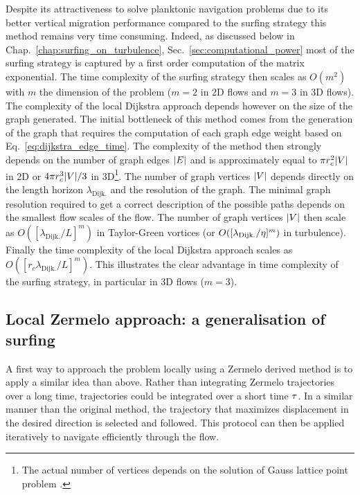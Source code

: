 Despite its attractiveness to solve planktonic navigation problems due to its better vertical migration performance compared to the surfing strategy this method remains very time consuming.
Indeed, as discussed below in Chap.~\ref{chap:surfing_on_turbulence}, Sec.~\ref{sec:computational_power} most of the surfing strategy is captured by a first order computation of the matrix exponential. 
The time complexity of the surfing strategy then scales as $O(m^2)$ with $m$ the dimension of the problem ($m=2$ in 2D flows and $m=3$ in 3D flows).
The complexity of the local Dijkstra approach depends however on the size of the graph generated.
The initial bottleneck of this method comes from the generation of the graph that requires the computation of each graph edge weight based on Eq.~\eqref{eq:dijkstra_edge_time}.
The complexity of the method then strongly depends on the number of graph edges $\lvert E\rvert$ and is approximately equal to $\pi r_c^2 \lvert V\rvert$ in 2D or $4 \pi r_c^3 \lvert V\rvert / 3$ in 3D\footnote{The actual number of vertices depends on the solution of Gauss lattice point problem \citep{guy2004unsolved}.}.
The number of graph vertices $\lvert V\rvert$ depends directly on the length horizon $\lambda_{\mathrm{Dijk.}}$ and the resolution of the graph.
The minimal graph resolution required to get a correct description of the possible paths depends on the smallest flow scales of the flow.
The number of graph vertices $\lvert V\rvert$ then scale as $O([\lambda_{\mathrm{Dijk.}}/L]^m)$ in Taylor-Green vortices (or $O([\lambda_{\mathrm{Dijk.}}/\eta]^m)$ in turbulence).
Finally the time complexity of the local Dijkstra approach scales as $O([r_c \lambda_{\mathrm{Dijk.}}/L]^m)$.
This illustrates the clear advantage in time complexity of the surfing strategy, in particular in 3D flows ($m = 3$).

\subsection{Local Zermelo approach: a generalisation of surfing}\label{sec:surfing_generalisation}

A first way to approach the problem locally using a Zermelo derived method is to apply a similar idea than above.
Rather than integrating Zermelo trajectories over a long time, trajectories could be integrated over a short time $\tau$.
In a similar manner than the original method, the trajectory that maximizes displacement in the desired direction is selected and followed.
This protocol can then be applied iteratively to navigate efficiently through the flow. 

